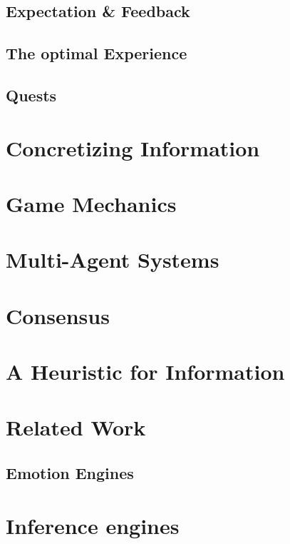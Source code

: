 \subsection{Expectation \& Feedback}
\subsection{The optimal Experience}
\subsection{Quests}
\section{Concretizing Information}
\section{Game Mechanics}
\section{Multi-Agent Systems}
\section{Consensus}
\section{A Heuristic for Information}
\section{Related Work}
\subsection{Emotion Engines}
\section{Inference engines}
